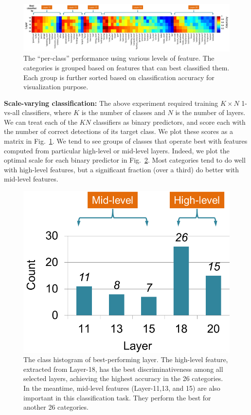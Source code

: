 \documentclass[10pt,twocolumn,letterpaper]{article}
\begin{document}
\begin{figure}[ht!]
\centering
	\includegraphics[width=1\textwidth]{fig/fig_level_perf.png}
\caption{The ``per-class'' performance using various levels of feature. The categories is grouped based on features that can best classified them. Each group is further sorted based on classification accuracy for visualization purpose. } 
\label{fig:level_perf}
\end{figure}


{\bf Scale-varying classification:} The above experiment required training $K \times N$ 1-vs-all classifiers, where $K$ is the number of classes and $N$ is the number of layers. We can treat each of the $KN$ classifiers as binary predictors, and score each with the number of correct detections of its target class. We plot these scores as a matrix in Fig.~\ref{fig:level_perf}. We tend to see groups of classes that operate best with features computed from particular high-level or mid-level layers. Indeed, we plot the optimal scale for each binary predictor in Fig.~\ref{fig:best_perf_layer_hist}. Most categories tend to do well with high-level features, but a significant fraction (over a third) do better with mid-level features.

\begin{figure}[htbp]
\centering
	\includegraphics[width=.6\columnwidth]{fig/best_perf_layer_hist.png}
\caption{The class histogram of best-performing layer. The high-level feature, extracted from Layer-18,  has the best discriminativeness among all selected layers, achieving the highest accuracy in the 26 categories. In the meantime, mid-level features (Layer-11,13, and 15) are also important in this classification task. They perform the best for another 26 categories. }
\label{fig:best_perf_layer_hist}
\end{figure}
\end{document}
